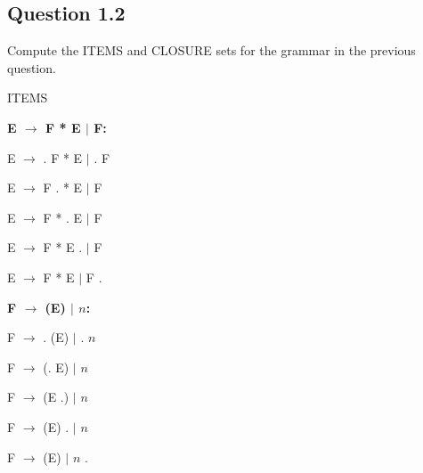 \documentclass[11pt, oneside]{article}   	%
\begin{document}
\subsection*{Question 1.2} 
\par Compute the ITEMS and CLOSURE sets for the grammar in the previous question.
\par ITEMS
\par \textbf{E $\rightarrow$ F * E $|$ F:}
\par E $\rightarrow$ . F * E $|$ . F
\par E $\rightarrow$ F . * E $|$ F
\par E $\rightarrow$ F * . E $|$ F
\par E $\rightarrow$ F * E . $|$ F
\par E $\rightarrow$ F * E $|$ F .
\par \textbf{F $\rightarrow$ (E) $|$ $n$:}
\par F $\rightarrow$ . (E) $|$ . $n$
\par F $\rightarrow$ (. E) $|$ $n$
\par F $\rightarrow$ (E .) $|$ $n$
\par F $\rightarrow$ (E) . $|$ $n$
\par F $\rightarrow$ (E) $|$ $n$ .
\end{document}
